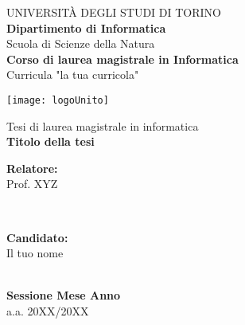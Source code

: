\documentclass[a4paper]{report}
\begin{document}
    \begin{titlepage}
        \begin{center}
            {\large \uppercase{Università degli studi di Torino}}\\[0.6cm]
            {\large \bf Dipartimento di Informatica}\\[0.6cm]
            {Scuola di Scienze della Natura}\\[0.6cm]
            {\large \bf Corso di laurea magistrale in Informatica}\\[0.5cm]
            {Curricula "la tua curricola"}\\[0.5cm]
            
            \vspace{0.1cm}
            \begin{center}
                \texttt{[image: logoUnito]}
            \end{center}
            \vspace{0.3cm}
            
            {Tesi di laurea magistrale in informatica}\\[1cm]
            {\huge \bf Titolo della tesi}\\[2.0cm]
            
           \begin{minipage}{0.4\textwidth}
               \begin{flushleft} \large
                   \textbf{Relatore:}\\
                   {Prof. XYZ}
               \end{flushleft}
           \end{minipage}
           ~
           \begin{minipage}{0.4\textwidth}
               \begin{flushright} \large
                   \textbf{Candidato:} \\
                   {Il tuo nome} \\
               \end{flushright}
           \end{minipage}\\[1cm]
           {\bf Sessione Mese Anno}\\
           {a.a. 20XX/20XX}
           \clearpage
        \end{center}
    \end{titlepage}
    
    
\end{document}
